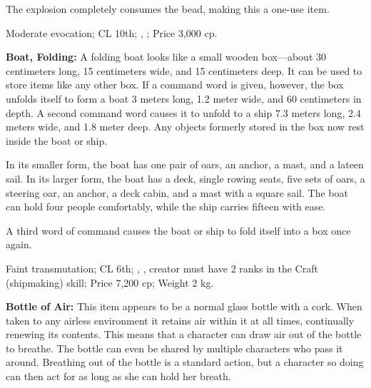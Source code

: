 The explosion completely consumes the bead, making this a one-use item.

Moderate evocation; CL 10th; , ; Price 3,000 cp.








\textbf{Boat, Folding:} A folding boat looks like a small wooden box---about 30 centimeters long, 15 centimeters wide, and 15 centimeters deep. It can be used to store items like any other box. If a command word is given, however, the box unfolds itself to form a boat 3 meters long, 1.2 meter wide, and 60 centimeters in depth. A second command word causes it to unfold to a ship 7.3 meters long, 2.4 meters wide, and 1.8 meter deep. Any objects formerly stored in the box now rest inside the boat or ship.

In its smaller form, the boat has one pair of oars, an anchor, a mast, and a lateen sail. In its larger form, the boat has a deck, single rowing seats, five sets of oars, a steering oar, an anchor, a deck cabin, and a mast with a square sail. The boat can hold four people comfortably, while the ship carries fifteen with ease.

A third word of command causes the boat or ship to fold itself into a box once again.

Faint transmutation; CL 6th; , , creator must have 2 ranks in the Craft (shipmaking) skill; Price 7,200 cp; Weight 2 kg.



\textbf{Bottle of Air:} This item appears to be a normal glass bottle with a cork. When taken to any airless environment it retains air within it at all times, continually renewing its contents. This means that a character can draw air out of the bottle to breathe. The bottle can even be shared by multiple characters who pass it around. Breathing out of the bottle is a standard action, but a character so doing can then act for as long as she can hold her breath.

